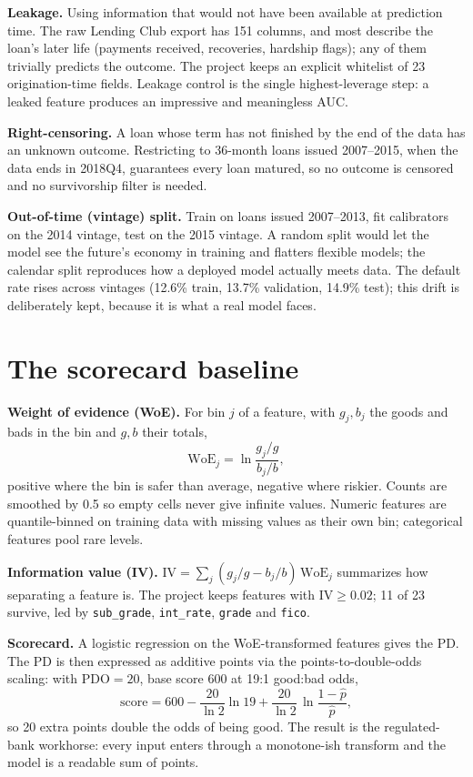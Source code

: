 \documentclass[a4paper,11pt]{article}
\newcommand{\term}[1]{\textbf{#1}}
\begin{document}
\term{Leakage.} Using information that would not have been available at prediction time. The raw Lending Club export has 151 columns, and most describe the loan's later life (payments received, recoveries, hardship flags); any of them trivially predicts the outcome. The project keeps an explicit whitelist of 23 origination-time fields. Leakage control is the single highest-leverage step: a leaked feature produces an impressive and meaningless AUC.

\term{Right-censoring.} A loan whose term has not finished by the end of the data has an unknown outcome. Restricting to 36-month loans issued 2007--2015, when the data ends in 2018Q4, guarantees every loan matured, so no outcome is censored and no survivorship filter is needed.

\term{Out-of-time (vintage) split.} Train on loans issued 2007--2013, fit calibrators on the 2014 vintage, test on the 2015 vintage. A random split would let the model see the future's economy in training and flatters flexible models; the calendar split reproduces how a deployed model actually meets data. The default rate rises across vintages (12.6\% train, 13.7\% validation, 14.9\% test); this drift is deliberately kept, because it is what a real model faces.

\section{The scorecard baseline}

\term{Weight of evidence (WoE).} For bin $j$ of a feature, with $g_j, b_j$ the goods and bads in the bin and $g, b$ their totals,
\begin{equation}
\mathrm{WoE}_j=\ln\!\frac{g_j/g}{b_j/b},
\end{equation}
positive where the bin is safer than average, negative where riskier. Counts are smoothed by 0.5 so empty cells never give infinite values. Numeric features are quantile-binned on training data with missing values as their own bin; categorical features pool rare levels.

\term{Information value (IV).} $\mathrm{IV}=\sum_j (g_j/g-b_j/b)\,\mathrm{WoE}_j$ summarizes how separating a feature is. The project keeps features with $\mathrm{IV}\ge 0.02$; 11 of 23 survive, led by \texttt{sub\_grade}, \texttt{int\_rate}, \texttt{grade} and \texttt{fico}.

\term{Scorecard.} A logistic regression on the WoE-transformed features gives the PD. The PD is then expressed as additive points via the points-to-double-odds scaling: with $\mathrm{PDO}=20$, base score 600 at 19:1 good:bad odds,
\begin{equation}
\text{score}=600-\frac{20}{\ln 2}\ln 19+\frac{20}{\ln 2}\,\ln\frac{1-\hat p}{\hat p},
\end{equation}
so 20 extra points double the odds of being good. The result is the regulated-bank workhorse: every input enters through a monotone-ish transform and the model is a readable sum of points.
\end{document}
